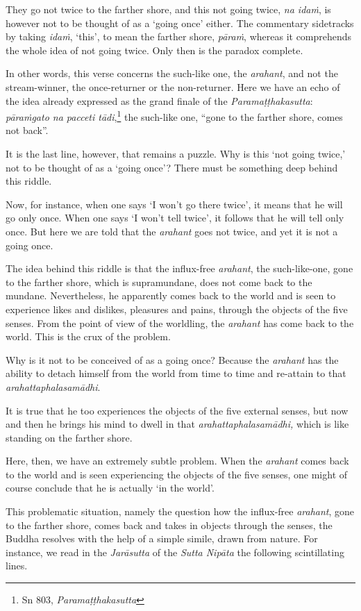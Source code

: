 They go not twice to the farther shore, and this not going twice, \emph{na idaṁ}, is however not to be thought of as a `going once' either. The commentary sidetracks by taking \emph{idaṁ}, `this', to mean the farther shore, \emph{pāraṁ}, whereas it comprehends the whole idea of not going twice. Only then is the paradox complete.

In other words, this verse concerns the such-like one, the \emph{arahant}, and not the stream-winner, the once-returner or the non-returner. Here we have an echo of the idea already expressed as the grand finale of the \emph{Paramaṭṭhakasutta}: \emph{pāraṁgato na pacceti tādi},\footnote{Sn 803, \emph{Paramaṭṭhakasutta}} the such-like one, ``gone to the farther shore, comes not back''.

It is the last line, however, that remains a puzzle. Why is this `not going twice,' not to be thought of as a `going once'? There must be something deep behind this riddle.

Now, for instance, when one says `I won't go there twice', it means that he will go only once. When one says `I won't tell twice', it follows that he will tell only once. But here we are told that the \emph{arahant} goes not twice, and yet it is not a going once.

The idea behind this riddle is that the influx-free \emph{arahant}, the such-like-one, gone to the farther shore, which is supramundane, does not come back to the mundane. Nevertheless, he apparently comes back to the world and is seen to experience likes and dislikes, pleasures and pains, through the objects of the five senses. From the point of view of the worldling, the \emph{arahant} has come back to the world. This is the crux of the problem.

Why is it not to be conceived of as a going once? Because the \emph{arahant} has the ability to detach himself from the world from time to time and re-attain to that \emph{arahattaphalasamādhi}.

It is true that he too experiences the objects of the five external senses, but now and then he brings his mind to dwell in that \emph{arahattaphalasamādhi,} which is like standing on the farther shore.

Here, then, we have an extremely subtle problem. When the \emph{arahant} comes back to the world and is seen experiencing the objects of the five senses, one might of course conclude that he is actually `in the world'.

This problematic situation, namely the question how the influx-free \emph{arahant}, gone to the farther shore, comes back and takes in objects through the senses, the Buddha resolves with the help of a simple simile, drawn from nature. For instance, we read in the \emph{Jarāsutta} of the \emph{Sutta Nipāta} the following scintillating lines.

